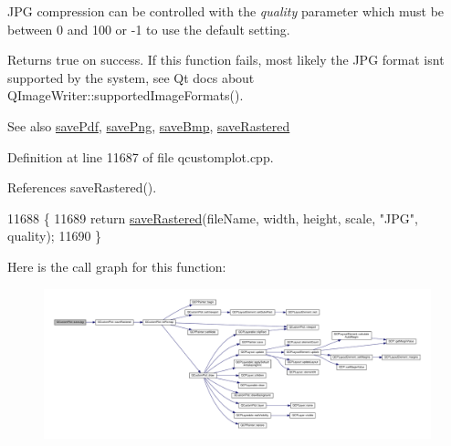 J\+P\+G compression can be controlled with the {\itshape quality} parameter which must be between 0 and 100 or -\/1 to use the default setting.

Returns true on success. If this function fails, most likely the J\+P\+G format isn\textquotesingle{}t supported by the system, see Qt docs about Q\+Image\+Writer\+::supported\+Image\+Formats().

\begin{DoxySeeAlso}{See also}
\hyperlink{class_q_custom_plot_a632da44c6d94ea8b271eb483b08b5114}{save\+Pdf}, \hyperlink{class_q_custom_plot_a7636261aff1f6d25c9da749ece3fc8b8}{save\+Png}, \hyperlink{class_q_custom_plot_a6629d9e8e6da4bf18055ee0257fdce9a}{save\+Bmp}, \hyperlink{class_q_custom_plot_ab528b84cf92baabe29b1d0ef2f77c93e}{save\+Rastered} 
\end{DoxySeeAlso}


Definition at line 11687 of file qcustomplot.\+cpp.



References save\+Rastered().


\begin{DoxyCode}
11688                                                      \{
11689   \textcolor{keywordflow}{return} \hyperlink{class_q_custom_plot_ab528b84cf92baabe29b1d0ef2f77c93e}{saveRastered}(fileName, width, height, scale, \textcolor{stringliteral}{"JPG"}, quality);
11690 \}
\end{DoxyCode}


Here is the call graph for this function\+:\nopagebreak
\begin{figure}[H]
\begin{center}
\leavevmode
\includegraphics[width=350pt]{class_q_custom_plot_a490c722092d1771e8ce4a7a73dfd84ab_cgraph}
\end{center}
\end{figure}


\hypertarget{class_q_custom_plot_a632da44c6d94ea8b271eb483b08b5114}{}
